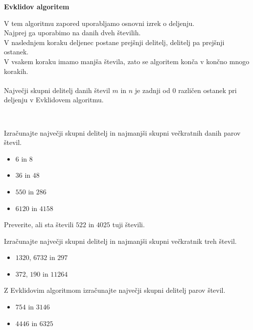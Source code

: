             \textbf{Evklidov algoritem}

                V tem algoritmu zapored uporabljamo osnovni izrek o deljenju. 
                \\ Najprej ga uporabimo na danih dveh številih.
                \\ V naslednjem koraku deljenec postane prejšnji delitelj, delitelj pa prejšnji ostanek. 
                \\ V vsakem koraku imamo manjša števila, zato se algoritem konča v končno mnogo korakih.
                \\ ~\\ Največji skupni delitelj danih števil $m$ in $n$ je zadnji od $0$ različen ostanek pri deljenju v Evklidovem algoritmu.
            

        

        ~\\
            \begin{naloga}
                Izračunajte največji skupni delitelj in najmanjši skupni večkratnih danih parov števil.
                \begin{itemize}
                    \item $6$ in $8$ 
                    \item $36$ in $48$ 
                    \item $550$ in $286$ 
                    \item $6120$ in $4158$ 
                \end{itemize}
            \end{naloga}
        
            \begin{naloga}
                Preverite, ali sta števili $522$ in $4025$ tuji števili. 
            \end{naloga}

            \begin{naloga}
                Izračunajte največji skupni delitelj in najmanjši skupni večkratnik treh števil.
                \begin{itemize}
                    \item $1320$, $6732$ in $297$ 
                    \item $372$, $190$ in $11264$ 
                \end{itemize}
            \end{naloga}
        
            \begin{naloga}
                Z Evklidovim algoritmom izračunajte največji skupni delitelj parov števil.
                \begin{itemize}
                    \item $754$ in $3146$ 
                    \item $4446$ in $6325$ 
                \end{itemize}
            \end{naloga}

